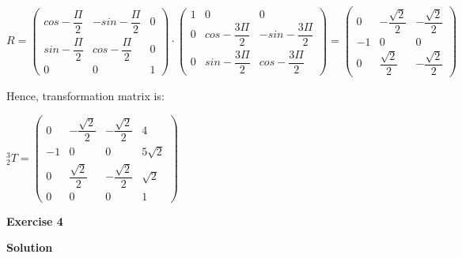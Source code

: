 \documentclass[12pt]{article}
\begin{document}
\begin{list}{)~}{}
$R=\left(\begin{array}{ccc}
cos -\dfrac{\Pi}{2} & -sin -\dfrac{\Pi}{2} & 0 \\
sin -\dfrac{\Pi}{2} & cos -\dfrac{\Pi}{2} & 0\\
0 & 0 & 1\end{array}\right)\cdot 
\left(\begin{array}{ccc}
1 & 0 & 0 \\
0 & cos -\dfrac{3 \Pi}{2} & -sin -\dfrac{3 \Pi}{2}  \\
0 & sin -\dfrac{3 \Pi}{2} & cos -\dfrac{3 \Pi}{2} \end{array}\right)=
\left(\begin{array}{ccc}
0 & - \dfrac{\sqrt{2}}{2} & - \dfrac{\sqrt{2}}{2} \\
-1 & 0 & 0 \\
0 & \dfrac{\sqrt{2}}{2} & - \dfrac{\sqrt{2}}{2}\end{array}\right)$ 
\end{list}

Hence, transformation matrix is:

$_{2}^{3}T = \left(\begin{array}{cccc}
0 & - \dfrac{\sqrt{2}}{2} & -\dfrac{\sqrt{2}}{2} & 4 \\
-1 & 0 & 0 & 5\sqrt{2}\\
0 & \dfrac{\sqrt{2}}{2} & - \dfrac{\sqrt{2}}{2} & \sqrt{2}\\
0 & 0 & 0 & 1\end{array}\right)$

\newpage

\textbf{Exercise 4}		
		
\textbf{Solution}
\end{document}
